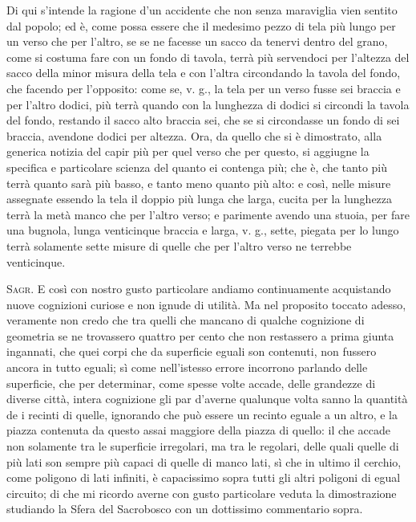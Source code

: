\documentclass[11pt,twoside,openany]{book}
\newcommand{\speaker}[1]{\textcolor{rubric}{\textsc{#1}}\space}
\begin{document}
Di qui s'intende la ragione d'un accidente che non senza maraviglia vien sentito dal popolo; ed è, come possa essere che il medesimo pezzo di tela più lungo per un verso che per l'altro, se se ne facesse un sacco da tenervi dentro del grano, come si costuma fare con un fondo di tavola, terrà più servendoci per l'altezza del sacco della minor misura della tela e con l'altra circondando la tavola del fondo, che facendo per l'opposito: come se, v. g., la tela per un verso fusse sei braccia e per l'altro dodici, più terrà quando con la lunghezza di dodici si circondi la tavola del fondo, restando il sacco alto braccia sei, che se si circondasse un fondo di sei braccia, avendone dodici per altezza. Ora, da quello che si è dimostrato, alla generica notizia del capir più per quel verso che per questo, si aggiugne la specifica e particolare scienza del quanto ei contenga più; che è, che tanto più terrà quanto sarà più basso, e tanto meno quanto più alto: e così, nelle misure assegnate essendo la tela il doppio più lunga che larga, cucita per la lunghezza terrà la metà manco che per l'altro verso; e parimente avendo una stuoia, per fare una bugnola, lunga venticinque braccia e larga, v. g., sette, piegata per lo lungo terrà solamente sette misure di quelle che per l'altro verso ne terrebbe venticinque.

\speaker{Sagr.} E così con nostro gusto particolare andiamo continuamente acquistando nuove cognizioni curiose e non ignude di utilità. Ma nel proposito toccato adesso, veramente non credo che tra quelli che mancano di qualche cognizione di geometria se ne trovassero quattro per cento che non restassero a prima giunta ingannati, che quei corpi che da superficie eguali son contenuti, non fussero ancora in tutto eguali; sì come nell'istesso errore incorrono parlando delle superficie, che per determinar, come spesse volte accade, delle grandezze di diverse città, intera cognizione gli par d'averne qualunque volta sanno la quantità de i recinti di quelle, ignorando che può essere un recinto eguale a un altro, e la piazza contenuta da questo assai maggiore della piazza di quello: il che accade non solamente tra le superficie irregolari, ma tra le regolari, delle quali quelle di più lati son sempre più capaci di quelle di manco lati, sì che in ultimo il cerchio, come poligono di lati infiniti, è capacissimo sopra tutti gli altri poligoni di egual circuito; di che mi ricordo averne con gusto particolare veduta la dimostrazione studiando la Sfera del Sacrobosco con un dottissimo commentario sopra.
\end{document}
